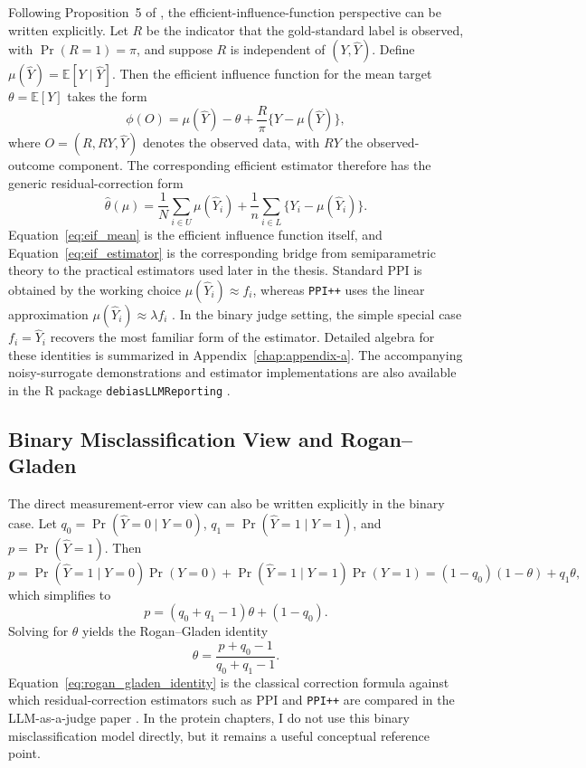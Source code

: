 Following Proposition~5 of \textcite{llmjudge_eif}, the efficient-influence-function perspective can be written explicitly. Let $R$ be the indicator that the gold-standard label is observed, with $\Pr(R=1)=\pi$, and suppose $R$ is independent of $(Y,\widehat{Y})$. Define \(\mu(\widehat{Y}) = \mathbb{E}[Y \mid \widehat{Y}]\). Then the efficient influence function for the mean target $\theta=\mathbb{E}[Y]$ takes the form
\begin{equation}
\phi(O)
=
\mu(\widehat{Y}) - \theta
+
\frac{R}{\pi}\{Y-\mu(\widehat{Y})\},
\label{eq:eif_mean}
\end{equation}
where $O=(R, RY, \widehat{Y})$ denotes the observed data, with $RY$ the observed-outcome component. The corresponding efficient estimator therefore has the generic residual-correction form
\begin{equation}
\widehat{\theta}(\mu)
=
\frac{1}{N}\sum_{i \in U}\mu(\widehat{Y}_i)
+
\frac{1}{n}\sum_{i \in L}\{Y_i-\mu(\widehat{Y}_i)\}.
\label{eq:eif_estimator}
\end{equation}
Equation~\eqref{eq:eif_mean} is the efficient influence function itself, and Equation~\eqref{eq:eif_estimator} is the corresponding bridge from semiparametric theory to the practical estimators used later in the thesis. Standard PPI is obtained by the working choice $\mu(\widehat{Y}_i) \approx f_i$, whereas \texttt{PPI++} uses the linear approximation $\mu(\widehat{Y}_i) \approx \lambda f_i$ \parencite{ppi_framework, ppi_pp, llmjudge_eif}. In the binary judge setting, the simple special case $f_i=\widehat{Y}_i$ recovers the most familiar form of the estimator. Detailed algebra for these identities is summarized in Appendix~\ref{chap:appendix-a}. The accompanying noisy-surrogate demonstrations and estimator implementations are also available in the R package \texttt{debiasLLMReporting} \parencite{debias_pkg}.

\subsection{Binary Misclassification View and Rogan--Gladen}

The direct measurement-error view can also be written explicitly in the binary case. Let \(q_0 = \Pr(\widehat{Y}=0 \mid Y=0)\), \(q_1 = \Pr(\widehat{Y}=1 \mid Y=1)\), and \(p = \Pr(\widehat{Y}=1)\).
Then
\[
p
=
\Pr(\widehat{Y}=1 \mid Y=0)\Pr(Y=0)
+
\Pr(\widehat{Y}=1 \mid Y=1)\Pr(Y=1)
=
(1-q_0)(1-\theta)+q_1\theta,
\]
which simplifies to
\[
p = (q_0+q_1-1)\theta + (1-q_0).
\]
Solving for $\theta$ yields the Rogan--Gladen identity
\begin{equation}
\theta = \frac{p+q_0-1}{q_0+q_1-1}.
\label{eq:rogan_gladen_identity}
\end{equation}
Equation~\eqref{eq:rogan_gladen_identity} is the classical correction formula against which residual-correction estimators such as PPI and \texttt{PPI++} are compared in the LLM-as-a-judge paper \parencite{rogan_gladen, llmjudge_eif}. In the protein chapters, I do not use this binary misclassification model directly, but it remains a useful conceptual reference point.

